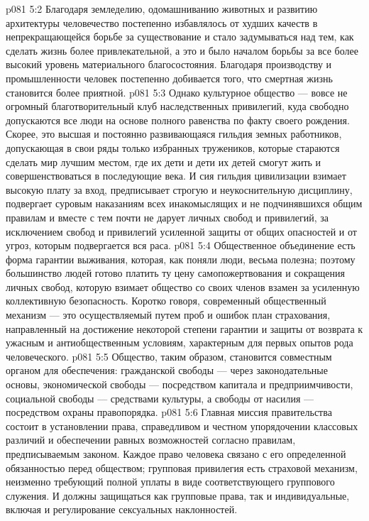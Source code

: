 \vs p081 5:2 Благодаря земледелию, одомашниванию животных и развитию архитектуры человечество постепенно избавлялось от худших качеств в непрекращающейся борьбе за существование и стало задумываться над тем, как сделать жизнь более привлекательной, а это и было началом борьбы за все более высокий уровень материального благосостояния. Благодаря производству и промышленности человек постепенно добивается того, что смертная жизнь становится более приятной.
\vs p081 5:3 Однако культурное общество --- вовсе не огромный благотворительный клуб наследственных привилегий, куда свободно допускаются все люди на основе полного равенства по факту своего рождения. Скорее, это высшая и постоянно развивающаяся гильдия земных работников, допускающая в свои ряды только избранных тружеников, которые стараются сделать мир лучшим местом, где их дети и дети их детей смогут жить и совершенствоваться в последующие века. И сия гильдия цивилизации взимает высокую плату за вход, предписывает строгую и неукоснительную дисциплину, подвергает суровым наказаниям всех инакомыслящих и не подчинявшихся общим правилам и вместе с тем почти не дарует личных свобод и привилегий, за исключением свобод и привилегий усиленной защиты от общих опасностей и от угроз, которым подвергается вся раса.
\vs p081 5:4 Общественное объединение есть форма гарантии выживания, которая, как поняли люди, весьма полезна; поэтому большинство людей готово платить ту цену самопожертвования и сокращения личных свобод, которую взимает общество со своих членов взамен за усиленную коллективную безопасность. Коротко говоря, современный общественный механизм --- это осуществляемый путем проб и ошибок план страхования, направленный на достижение некоторой степени гарантии и защиты от возврата к ужасным и антиобщественным условиям, характерным для первых опытов рода человеческого.
\vs p081 5:5 Общество, таким образом, становится совместным органом для обеспечения: гражданской свободы --- через законодательные основы, экономической свободы --- посредством капитала и предприимчивости, социальной свободы --- средствами культуры, а свободы от насилия --- посредством охраны правопорядка.
\vs p081 5:6  Главная миссия правительства состоит в установлении права, справедливом и честном упорядочении классовых различий и обеспечении равных возможностей согласно правилам, предписываемым законом. Каждое право человека связано с его определенной обязанностью перед обществом; групповая привилегия есть страховой механизм, неизменно требующий полной уплаты в виде соответствующего группового служения. И должны защищаться как групповые права, так и индивидуальные, включая и регулирование сексуальных наклонностей.
